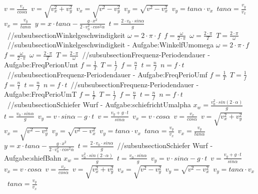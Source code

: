 $ v= \frac{ v_{x} }{ cos\alpha } $\ 
$ v= \sqrt{ v_{x} ^{2} + v_{y} ^{2} } $\ 
$ v_{x} = \sqrt{ v^{2}  - v_{y} ^{2} } $\ 
$ v_{y} = \sqrt{ v^{2}  - v_{x} ^{2} } $\ 
$ v_{y} = tan \alpha \cdot  v_{x} $\ 
$ tan \alpha = \frac{v_{y} }{v_{x} } $\ 
$ v_{x} = \frac{v_{y} }{tan \alpha } $\ 
$ y = x\cdot tan \alpha  - \frac{   g\cdot x^{2} }{2\cdot v^{2} _{0} \cdot cos ^{2}\alpha } $\ 
$ t =\frac{2\cdot v_{0} \cdot sin \alpha }{ g} $\ 
//subsubsection{Winkelgeschwindigkeit} 
$ \omega  = 2\cdot \pi \cdot f $\ 
$ f = \frac{\omega }{2\cdot \pi } $\ 
$ \omega  = \frac{2\cdot \pi }{ T} $\ 
$ T = \frac{2\cdot \pi }{ \omega } $\ 
//subsubsection{Winkelgeschwindigkeit - Aufgabe:WinkelfUmomega} 
$ \omega  = 2\cdot \pi \cdot f $\ 
$ f = \frac{\omega }{2\cdot \pi } $\ 
$ \omega  = \frac{2\cdot \pi }{ T} $\ 
$ T = \frac{2\cdot \pi }{ \omega } $\ 
//subsubsection{Frequenz-Periodendauer - Aufgabe:FreqPerionUmt} 
$ f = \frac{1}{T} $\ 
$ T = \frac{1}{f} $\ 
$ f = \frac{n}{t} $\ 
$ t = \frac{n}{f} $\ 
$ n = f\cdot t $\ 
//subsubsection{Frequenz-Periodendauer - Aufgabe:FreqPerioUmf} 
$ f = \frac{1}{T} $\ 
$ T = \frac{1}{f} $\ 
$ f = \frac{n}{t} $\ 
$ t = \frac{n}{f} $\ 
$ n = f\cdot t $\ 
//subsubsection{Frequenz-Periodendauer - Aufgabe:FreqPerioUmT} 
$ f = \frac{1}{T} $\ 
$ T = \frac{1}{f} $\ 
$ f = \frac{n}{t} $\ 
$ t = \frac{n}{f} $\ 
$ n = f\cdot t $\ 
//subsubsection{Schiefer Wurf  - Aufgabe:schiefrichtUmalpha} 
$ x_{w}  = \frac{v_{0} ^{2} \cdot sin(2\cdot \alpha )}{       g} $\ 
$ t =\frac{v_{0} \cdot sin \alpha }{  g} $\ 
$ v_{y}  =  v\cdot sin\alpha - g\cdot t $\ 
$ v= \frac{ v_{y} +g\cdot t}{ sin\alpha } $\ 
$ v_{x}  = v\cdot  cos\alpha $\ 
$ v= \frac{ v_{x} }{ cos\alpha } $\ 
$ v= \sqrt{ v_{x} ^{2} + v_{y} ^{2} } $\ 
$ v_{x} = \sqrt{ v^{2}  - v_{y} ^{2} } $\ 
$ v_{y} = \sqrt{ v^{2}  - v_{x} ^{2} } $\ 
$ v_{y} = tan \alpha \cdot  v_{x} $\ 
$ tan \alpha = \frac{v_{y} }{v_{x} } $\ 
$ v_{x} = \frac{v_{y} }{tan \alpha } $\ 
$ y = x\cdot tan \alpha  - \frac{   g\cdot x^{2} }{2\cdot v^{2} _{0} \cdot cos ^{2}\alpha } $\ 
$ t =\frac{2\cdot v_{0} \cdot sin \alpha }{ g} $\ 
//subsubsection{Schiefer Wurf  - Aufgabe:shiefBahn} 
$ x_{w}  = \frac{v_{0} ^{2} \cdot sin(2\cdot \alpha )}{       g} $\ 
$ t =\frac{v_{0} \cdot sin \alpha }{  g} $\ 
$ v_{y}  =  v\cdot sin\alpha - g\cdot t $\ 
$ v= \frac{ v_{y} +g\cdot t}{ sin\alpha } $\ 
$ v_{x}  = v\cdot  cos\alpha $\ 
$ v= \frac{ v_{x} }{ cos\alpha } $\ 
$ v= \sqrt{ v_{x} ^{2} + v_{y} ^{2} } $\ 
$ v_{x} = \sqrt{ v^{2}  - v_{y} ^{2} } $\ 
$ v_{y} = \sqrt{ v^{2}  - v_{x} ^{2} } $\ 
$ v_{y} = tan \alpha \cdot  v_{x} $\ 
$ tan \alpha = \frac{v_{y} }{v_{x} } $\ 
